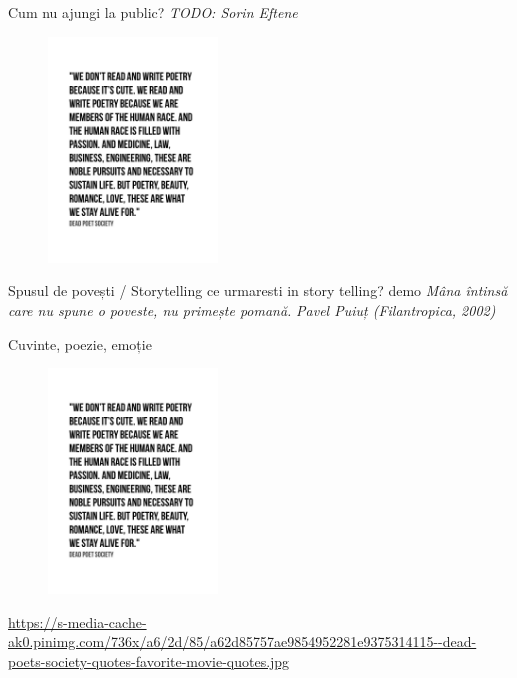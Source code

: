 \documentclass{beamer}
\begin{document}
\begin{frame}{Cum nu ajungi la public?}
  \centering
  \textit{TODO: Sorin Eftene}
  \begin{figure}
    \centering
    \includegraphics[width=0.4\textwidth]{img/dead-poets-society-words-alive} %
  \end{figure}
\end{frame}

\begin{frame}{Spusul de povești / Storytelling}
  ce urmaresti in story telling?
  demo
  \centering
  \textit{Mâna întinsă care nu spune o poveste, nu primește pomană.}
  \vspace{3mm}
  \hfill \textit{Pavel Puiuț (Filantropica, 2002)}
\end{frame}

\begin{frame}{Cuvinte, poezie, emoție}
  \begin{figure}
    \centering
    \includegraphics[width=0.4\textwidth]{img/dead-poets-society-words-alive}
  \end{figure}
  \begin{center}
    \tiny
    \url{https://s-media-cache-ak0.pinimg.com/736x/a6/2d/85/a62d85757ae9854952281e9375314115--dead-poets-society-quotes-favorite-movie-quotes.jpg}
  \end{center}
\end{frame}
\end{document}
